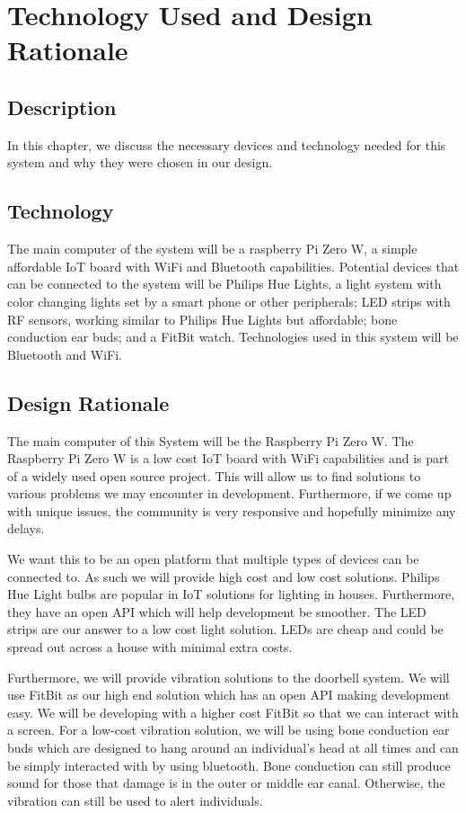 \chapter{Technology Used and Design Rationale}

\section{Description}
In this chapter, we discuss the necessary devices and technology needed for this system and why they were chosen in our design.

\section{Technology}
The main computer of the system will be a raspberry Pi Zero W, a simple affordable IoT board with WiFi and Bluetooth capabilities. Potential devices that can be connected to the system will be Philips Hue Lights, a light system with color changing lights set by a smart phone or other peripherals; LED strips with RF sensors, working similar to Philips Hue Lights but affordable; bone conduction ear buds; and a FitBit watch. Technologies used in this system will be Bluetooth and WiFi.

\section{Design Rationale}
The main computer of this System will be the Raspberry Pi Zero W. The Raspberry Pi Zero W is a low cost IoT board with WiFi capabilities and is part of a widely used open source project. This will allow us to find solutions to various problems we may encounter in development. Furthermore, if we come up with unique issues, the community is very responsive and hopefully minimize any delays.

	We want this to be an open platform that multiple types of devices can be connected to. As such we will provide high cost and low cost solutions. Philips Hue Light bulbs are popular in IoT solutions for lighting in houses. Furthermore, they have an open API which will help development be smoother. The LED strips are our answer to a low cost light solution. LEDs are cheap and could be spread out across a house with minimal extra costs.
	
	Furthermore, we will provide vibration solutions to the doorbell system. We will use FitBit as our high end solution which has an open API making development easy. We will be developing with a higher cost FitBit so that we can interact with a screen. For a low-cost vibration solution, we will be using bone conduction ear buds which are designed to hang around an individual’s head at all times and can be simply interacted with by using bluetooth. Bone conduction can still produce sound for those that damage is in the outer or middle ear canal. Otherwise, the vibration can still be used to alert individuals.
	
